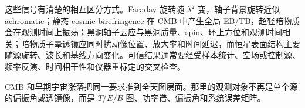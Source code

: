 这些信号有清楚的相互区分方式。Faraday 旋转随 \(\lambda^2\) 变，轴子背景旋转近似 achromatic；静态 cosmic birefringence 在 CMB 中产生全局 EB/TB，超轻暗物质会在观测时间上振荡；黑洞轴子云应与黑洞质量、spin、环上方位和观测时间相关；暗物质子晕透镜应同时扰动像位置、放大率和时间延迟，而恒星表面结构主要随源旋转、波长和基线方向变化。可信结果通常要经受样本统计、空场或控制源、频率反演、时间相干性和仪器重标定的交叉检查。

CMB 和早期宇宙涨落把同一要求推到全天图层面。那里的观测对象不再是单个源的偏振角或透镜像，而是 \(T/E/B\) 图、功率谱、偏振角和系统误差矩阵。

